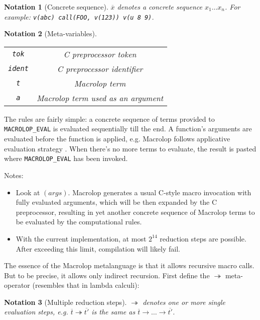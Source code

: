 \documentclass[12pt]{article}
\theoremstyle{break}
\newtheorem{notation}{Notation}
\begin{document}
\begin{notation}[Concrete sequence]
    \label{ConcreteSequenceNotation}
    $\overline{x}$ denotes a concrete sequence $x_1 \ldots x_n$. For example:
    \texttt{v(abc) call(FOO, v(123)) v(u 8 9)}.
\end{notation}

\begin{notation}[Meta-variables]
    \ \\
    \begin{tabular}{|c|c|}
        \hline
        \texttt{tok} & C preprocessor token \\
        \texttt{ident} & C preprocessor identifier \\
        \texttt{t} & Macrolop term \\
        \texttt{a} & Macrolop term used as an argument \\
        \hline
    \end{tabular}
\end{notation}

The rules are fairly simple: a concrete sequence of terms provided to \\ \texttt{MACROLOP\_EVAL} is evaluated sequentially till the end. A function's arguments
are evaluated before the function is applied, e.g. Macrolop follows applicative
evaluation strategy \cite{ApplicativeEvaluationStrategy}. When there's no more terms
to evaluate, the result is pasted where \texttt{MACROLOP\_EVAL} has been invoked.

Notes:

\begin{itemize}
    \item Look at $(args)$. Macrolop generates a usual C-style macro invocation with
    fully evaluated arguments, which will be then expanded by the C preprocessor, resulting
    in yet another concrete sequence of Macrolop terms to be evaluated by the computational
    rules.
    \item With the current implementation, at most $2^{14}$ reduction steps are
    possible. After exceeding this limit, compilation will likely fail.
\end{itemize}

The essence of the Macrolop metalanguage is that it allows recursive macro calls. But
to be precise, it allows only indirect recursion. First define the $\twoheadrightarrow$
meta-operator (resembles that in lambda calculi):

\begin{notation}[Multiple reduction steps]
    $\twoheadrightarrow$ denotes one or more single evaluation steps, e.g.
    $\overline{t} \twoheadrightarrow \overline{t'}$ is the same as
    $\overline{t} \to \ldots \to \overline{t'}$.
\end{notation}
\end{document}
